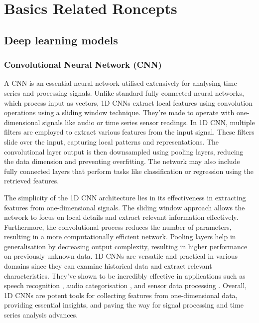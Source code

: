 
\chapter{Basics Related Roncepts} %

\label{c3} %

\section{Deep learning models}
\subsection{Convolutional Neural Network (CNN)}
A CNN is an essential neural network utilised extensively for analysing time series and processing signals. Unlike standard fully connected neural networks,  which process input as vectors,  1D CNNs extract local features using convolution operations using a sliding window technique. They're made to operate with one-dimensional signals like audio or time series sensor readings. In  \cite{chaerun2021comparative} 1D CNN,  multiple filters are employed to extract various features from the input signal. These filters slide over the input,  capturing local patterns and representations. The convolutional layer output is then downsampled using pooling layers,  reducing the data dimension and preventing overfitting. The network may also include fully connected layers that perform tasks like classification or regression using the retrieved features.
\par The simplicity of the 1D CNN \cite{kiranyaz20211d} architecture lies in its effectiveness in extracting features from one-dimensional signals. The sliding window approach allows the network to focus on local details and extract relevant information effectively. Furthermore,  the convolutional process reduces the number of parameters,  resulting in a more computationally efficient network. Pooling layers help in generalisation by decreasing output complexity,  resulting in higher performance on previously unknown data. 1D CNNs are versatile and practical in various domains since they can examine historical data and extract relevant characteristics. They've shown to be incredibly effective in applications such as speech recognition \cite{rusnac2022cnn, wang2019end},  audio categorisation \cite{ashraf2022role, hu2020device},  and sensor data processing \cite{kattenborn2021review, sun2019classification}. Overall,  1D CNNs are potent tools for collecting features from one-dimensional data,  providing essential insights,  and paving the way for signal processing and time series analysis advances.

